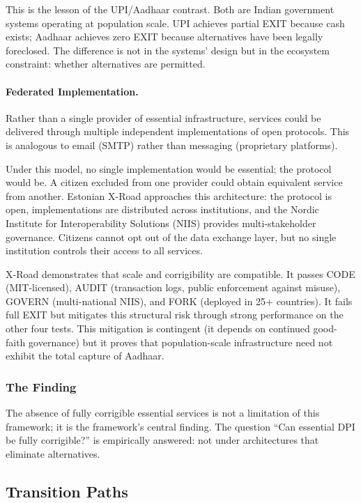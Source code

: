 This is the lesson of the UPI/Aadhaar contrast. Both are Indian government systems operating at population scale. UPI achieves partial EXIT because cash exists; Aadhaar achieves zero EXIT because alternatives have been legally foreclosed. The difference is not in the systems' design but in the ecosystem constraint: whether alternatives are permitted.

\paragraph{Federated Implementation.} Rather than a single provider of essential infrastructure, services could be delivered through multiple independent implementations of open protocols. This is analogous to email (SMTP) rather than messaging (proprietary platforms).

Under this model, no single implementation would be essential; the protocol would be. A citizen excluded from one provider could obtain equivalent service from another. Estonian X-Road approaches this architecture: the protocol is open, implementations are distributed across institutions, and the Nordic Institute for Interoperability Solutions (NIIS) provides multi-stakeholder governance. Citizens cannot opt out of the data exchange layer, but no single institution controls their access to all services.

X-Road demonstrates that scale and corrigibility are compatible. It passes CODE (MIT-licensed), AUDIT (transaction logs, public enforcement against misuse), GOVERN (multi-national NIIS), and FORK (deployed in 25+ countries). It fails full EXIT but mitigates this structural risk through strong performance on the other four tests. This mitigation is contingent (it depends on continued good-faith governance) but it proves that population-scale infrastructure need not exhibit the total capture of Aadhaar.

\subsubsection{The Finding}

The absence of fully corrigible essential services is not a limitation of this framework; it is the framework's central finding. The question ``Can essential DPI be fully corrigible?'' is empirically answered: not under architectures that eliminate alternatives.

\subsection{Transition Paths}
\label{subsec:transition}

